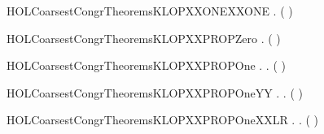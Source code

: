 \newcommand{\HOLCoarsestCongrTheoremsKLOPXXLEMMAXXFINITE}{\UseVerbatim{HOLCoarsestCongrTheoremsKLOPXXLEMMAXXFINITE}}
\begin{SaveVerbatim}{HOLCoarsestCongrTheoremsKLOPXXONEXXONE}
\HOLTokenTurnstile{} \HOLSymConst{\HOLTokenForall{}}.  ( )
\end{SaveVerbatim}
\newcommand{\HOLCoarsestCongrTheoremsKLOPXXONEXXONE}{\UseVerbatim{HOLCoarsestCongrTheoremsKLOPXXONEXXONE}}
\begin{SaveVerbatim}{HOLCoarsestCongrTheoremsKLOPXXPROPZero}
\HOLTokenTurnstile{} \HOLSymConst{\HOLTokenForall{}} .  (  )
\end{SaveVerbatim}
\newcommand{\HOLCoarsestCongrTheoremsKLOPXXPROPZero}{\UseVerbatim{HOLCoarsestCongrTheoremsKLOPXXPROPZero}}
\begin{SaveVerbatim}{HOLCoarsestCongrTheoremsKLOPXXPROPOne}
\HOLTokenTurnstile{} \HOLSymConst{\HOLTokenForall{}}  .    \HOLTokenTransBegin{} \HOLTokenTransEnd {} \HOLSymConst{\HOLTokenEquiv{}} \HOLSymConst{\HOLTokenExists{}}.  \HOLSymConst{\HOLTokenLt{}}  \HOLSymConst{\HOLTokenConj{}} ( \HOLSymConst{=}   )
\end{SaveVerbatim}
\newcommand{\HOLCoarsestCongrTheoremsKLOPXXPROPOne}{\UseVerbatim{HOLCoarsestCongrTheoremsKLOPXXPROPOne}}
\begin{SaveVerbatim}{HOLCoarsestCongrTheoremsKLOPXXPROPOneYY}
\HOLTokenTurnstile{} \HOLSymConst{\HOLTokenForall{}}  .    \HOLTokenWeakTransBegin{} \HOLTokenWeakTransEnd {} \HOLSymConst{\HOLTokenEquiv{}} \HOLSymConst{\HOLTokenExists{}}.  \HOLSymConst{\HOLTokenLt{}}  \HOLSymConst{\HOLTokenConj{}} ( \HOLSymConst{=}   )
\end{SaveVerbatim}
\newcommand{\HOLCoarsestCongrTheoremsKLOPXXPROPOneYY}{\UseVerbatim{HOLCoarsestCongrTheoremsKLOPXXPROPOneYY}}
\begin{SaveVerbatim}{HOLCoarsestCongrTheoremsKLOPXXPROPOneXXLR}
\HOLTokenTurnstile{} \HOLSymConst{\HOLTokenForall{}}  .    \HOLTokenTransBegin{} \HOLTokenTransEnd {} \HOLSymConst{\HOLTokenImp{}} \HOLSymConst{\HOLTokenExists{}}.  \HOLSymConst{\HOLTokenLt{}}  \HOLSymConst{\HOLTokenConj{}} ( \HOLSymConst{=}   )
\end{SaveVerbatim}
